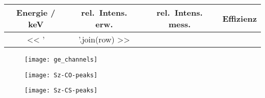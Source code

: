 \documentclass[11pt, ngerman, fleqn, DIV=15, headinclude, BCOR=2cm]{scrreprt}
\newcommand{\plotwidth}{0.8\linewidth}
\begin{document}
\begin{tabular}{SSSS}
    {Energie / \si{\kilo\electronvolt}} & {rel.\ Intens. erw.} & {rel.\ Intens.
mess.} & {Effizienz} \\
    \midrule
    << ' & '.join(row) >> \\
\end{tabular}





\begin{figure}
    \centering
    \texttt{[image: ge\_channels]}
    \caption{%
    }
    \label{fig:ge_kanal}
\end{figure}



\begin{figure}
    \centering
    \texttt{[image: Sz-CO-peaks]}
    \caption{%
    }
    \label{fig:}
\end{figure}

\begin{figure}
    \centering
    \texttt{[image: Sz-CS-peaks]}
    \caption{%
    }
    \label{fig:}
\end{figure}
\end{document}
